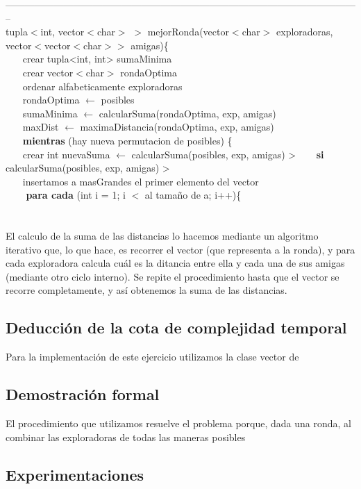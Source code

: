 --------------------------------------------------------------------------------------------------------------\\
tupla$<$int, vector$<$char$>$ $>$ mejorRonda(vector$<$char$>$ exploradoras, vector$<$vector$<$char$>>$ amigas)\{ \\
$~~~~~~~~$crear tupla<int, int> sumaMinima \\
$~~~~~~~~$crear vector$<$char$>$ rondaOptima  \\
$~~~~~~~~$ordenar alfabeticamente exploradoras  \\
$~~~~~~~~$rondaOptima $\leftarrow$ posibles \\
$~~~~~~~~$sumaMinima $\leftarrow$ calcularSuma(rondaOptima, exp, amigas)  \\
$~~~~~~~~$maxDist $\leftarrow$ maximaDistancia(rondaOptima, exp, amigas) \\
$~~~~~~~~$\textbf{mientras} (hay nueva permutacion de posibles) \{  \\
$~~~~~~~~$crear int nuevaSuma $\leftarrow$ calcularSuma(posibles, exp, amigas) >
$~~~~~~~~$\textbf{si} calcularSuma(posibles, exp, amigas) > \\
$~~~~~~~~$insertamos a masGrandes el primer elemento del vector  \\
$~~~~~~~~$ \textbf{para cada} (int i = 1; i $<$ al tamaño de a; i++)\{ \\  \\
\\

El calculo de la suma de las distancias lo hacemos mediante un algoritmo iterativo que, lo que hace, es recorrer el vector
(que representa a la ronda), y para cada exploradora calcula cuál es la ditancia entre ella y cada una de sus amigas (mediante 
otro ciclo interno). Se repite el procedimiento hasta que el vector se recorre completamente, y así obtenemos la suma de las distancias.  


\subsection{Deducción de la cota de complejidad temporal}

Para la implementación de este ejercicio utilizamos la clase vector de 

\subsection{Demostración formal}
El procedimiento que utilizamos resuelve el problema porque, dada una ronda, al combinar las exploradoras de todas las maneras 
posibles

\subsection{Experimentaciones}